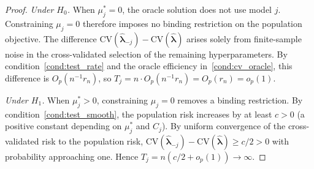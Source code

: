 \begin{proof}
\emph{Under $H_0$.}
When $\mu_j^* = 0$, the oracle solution does not use model $j$.
Constraining $\mu_j = 0$ therefore imposes no binding restriction on the
population objective.
The difference
$\mathrm{CV}(\hat{\boldsymbol{\lambda}}_{-j}) -
\mathrm{CV}(\hat{\boldsymbol{\lambda}})$
arises solely from finite-sample noise in the cross-validated selection
of the remaining hyperparameters.
By condition~\ref{cond:test_rate} and the oracle efficiency
in~\ref{cond:cv_oracle}, this difference is
$O_p(n^{-1} r_n)$, so $T_j = n \cdot O_p(n^{-1} r_n) = O_p(r_n) = o_p(1)$.

\emph{Under $H_1$.}
When $\mu_j^* > 0$, constraining $\mu_j = 0$ removes a binding
restriction.
By condition~\ref{cond:test_smooth},
the population risk increases by at least
$c > 0$ (a positive constant depending on $\mu_j^*$ and $C_j$).
By uniform convergence of the cross-validated risk to the population risk,
$\mathrm{CV}(\hat{\boldsymbol{\lambda}}_{-j}) -
\mathrm{CV}(\hat{\boldsymbol{\lambda}}) \geq c/2 > 0$
with probability approaching one.
Hence $T_j = n(c/2 + o_p(1)) \to \infty$.
\end{proof}
